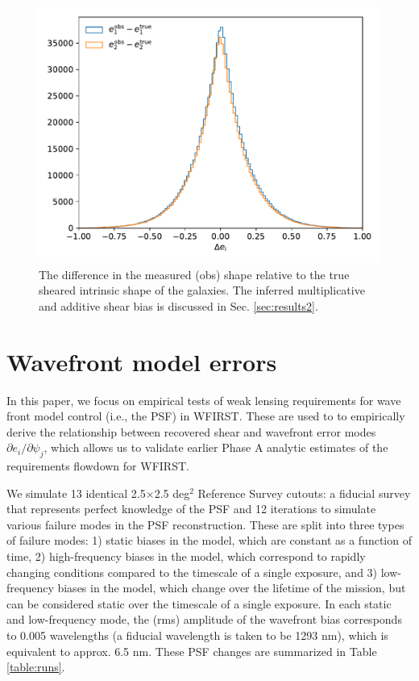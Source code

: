\documentclass[aps,prd, amsmath,amssymb,superscriptaddress,showkeys,nofootinbib,reprint,preprintnumbers]{revtex4-1}
\begin{document}
\begin{figure}
\begin{center}
\includegraphics[width=\columnwidth]{figures/shape_hist.pdf}
\end{center}
\caption[]{
The difference in the measured (obs) shape relative to the true sheared intrinsic shape of the galaxies. The inferred multiplicative and additive shear bias is discussed in Sec. \ref{sec:results2}. 
\label{fig:shape_hist}}
\end{figure}

\section{Wavefront model errors}\label{sec:results}

In this paper, we focus on empirical tests of weak lensing requirements for wave front model control (i.e., the PSF) in WFIRST. These are used to to empirically derive the relationship between recovered shear and wavefront error modes $\partial e_i / \partial \psi_j$, which allows us to validate earlier Phase A analytic estimates of the requirements flowdown for WFIRST.

We simulate 13 identical 2.5$\times$2.5 deg$^2$ Reference Survey cutouts: a fiducial survey that represents perfect knowledge of the PSF and 12 iterations to simulate various failure modes in the PSF reconstruction. 
These are split into three types of failure modes: 1) static biases in the model, which are constant as a function of time, 2) high-frequency biases in the model, which correspond to rapidly changing conditions compared to the timescale of a single exposure, and 3) low-frequency biases in the model, which change over the lifetime of the mission, but can be considered static over the timescale of a single exposure. 
In each static and low-frequency mode, the (rms) amplitude of the wavefront bias corresponds to 0.005 wavelengths (a fiducial wavelength is taken to be 1293 nm), which is equivalent to approx. 6.5 nm. These PSF changes are summarized in Table \ref{table:runs}.
\end{document}

